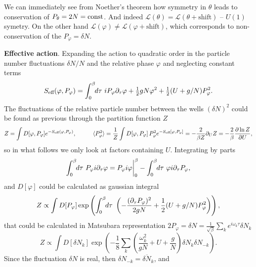 We can immediately see from Noether’s theorem how symmetry in $\theta$ leads to conservation of $P_\theta = 2N = \textnormal{const}$. And indeed $\mathcal{L}(\theta) = \mathcal{L}(\theta + \text{shift})$ -- $U(1)$ symetry. On the other hand $\mathcal{L}(\varphi) \neq \mathcal{L}(\varphi+\text{shift})$, which corresponds to non-conservation of the $P_\varphi = \delta N$.

\textbf{Effective action}. Expanding the action to quadratic order in the particle number fluctuations $\delta N / N$ and the relative phase $\varphi$ and neglecting constant terms
\begin{equation*}
	S_{\textnormal{eff}}(\varphi, P_\varphi) = \int_{0}^{\beta} \hspace{-1mm} d \tau\  i P_\varphi \partial_\tau \varphi + \tfrac{1}{2} g N\varphi^2 + \tfrac{1}{2}(U + g / N)P_\varphi^2.
\end{equation*}
The fluctuations of the relative particle number
between the wells $(\delta N)^2$ could be found as previous through the partition function $Z$
\begin{equation*}
	Z = \int D[\varphi, P_\varphi] e^{-\sub{S}{eff}(\varphi, P_\varphi)} , 
	\hspace{10 mm} 
	\langle P_\varphi^2\rangle = \frac{1}{Z} \int D[\varphi, P_\varphi]\, P_\varphi^2 e^{-\sub{S}{eff}[\varphi, P_\varphi]} = -\frac{2}{\beta Z} \partial_U Z = -\frac{2}{\beta} \frac{\partial \ln Z}{\partial U},
\end{equation*}
so in what follows we only look at factors containing $U$. Integrating by parts
\begin{equation*}
	\int_{0}^{\beta} \hspace{-1mm} d \tau\   P_\varphi i \partial_\tau \varphi = P_\varphi i  \varphi \bigg|_{0}^{\beta} - \int_{0}^{\beta} \hspace{-1mm} d \tau\  \varphi i \partial_\tau P_\varphi,
\end{equation*}
and $D[\varphi]$ could be calculated as gaussian integral
\begin{equation*}
	Z \propto \int D[P_\varphi] \exp
	\left(	\int_{0}^{\beta} \hspace{-1mm} d \tau\  
					\left(- \frac{(\partial_\tau P_\varphi)^2}{2 g N} + \frac{1}{2}(U+g/ N) P_\varphi^2\right)
				\right),
\end{equation*}
that could be calculated in Matsubara representation $2 P_\varphi = \delta N = \frac{1}{\sqrt{\beta}} \sum_k e^{i \omega_k \tau}  \delta N_k $
\begin{equation*}
	Z \propto \int D[\delta N_k] \exp\left(
		- \frac{1}{8}\sum_k \left(
			\frac{\omega_k^2}{gN} + U + \frac{g}{N}
		\right) \delta N_k \delta N_{-k}
	\right).
\end{equation*}
Since the fluctuation $\delta N$ is real, then $\delta N_{-k} = \overline{\delta N}_k$, and
